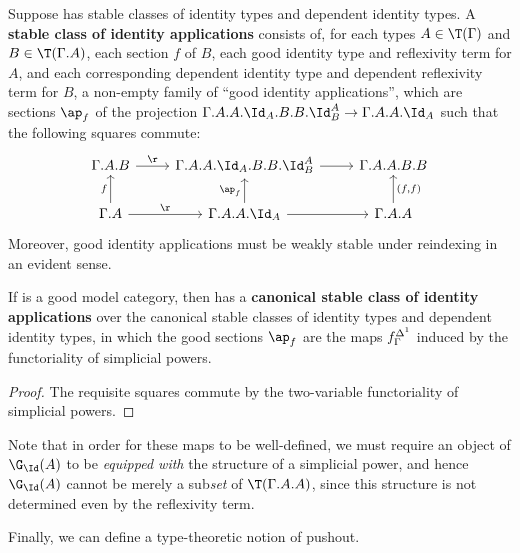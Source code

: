 \begin{defn}\label{defn:ap}
  Suppose \C has stable classes of identity types and dependent identity types.
  A \textbf{stable class of identity applications} consists of, for each types $A\in\T(\Gamma)$ and $B\in\T(\Gamma.A)$, each section $f$ of $B$, each good identity type and reflexivity term for $A$, and each corresponding dependent identity type and dependent reflexivity term for $B$, a non-empty family of ``good identity applications'', which are sections $\ap_f$ of the projection $\Gamma.A.A.\Id_A.B.B.\Id^A_B \to \Gamma.A.A.\Id_A$ such that the following squares commute:
  \[
  \begin{tikzcd}
    \Gamma.A.B \ar[r,"\r"] & \Gamma.A.A.\Id_A.B.B.\Id^A_B \ar[r] & \Gamma.A.A.B.B \\
    \Gamma.A \ar[r,"\r"] \ar[u,"f"] & \Gamma.A.A.\Id_A \ar[u,"{\ap_f}"] \ar[r] & \Gamma.A.A \ar[u,"{(f,f)}",swap]
  \end{tikzcd}
  \]
  Moreover, good identity applications must be weakly stable under reindexing in an evident sense.
\end{defn}

\begin{thm}\label{thm:stable-ap}
  If \sM is a good model category, then \fibm has a \textbf{canonical stable class of identity applications} over the canonical stable classes of identity types and dependent identity types, in which the good sections $\ap_f$ are the maps $f^{\Delta^1}_\Gamma$ induced by the functoriality of simplicial powers.
\end{thm}
\begin{proof}
  The requisite squares commute by the two-variable functoriality of simplicial powers.
\end{proof}

Note that in order for these maps to be well-defined, we must require an object of $\G_\Id(A)$ to be \emph{equipped with} the structure of a simplicial power, and hence $\G_\Id(A)$ cannot be merely a sub\emph{set} of $\T(\Gamma.A.A)$, since this structure is not determined even by the reflexivity term.

Finally, we can define a type-theoretic notion of pushout.

